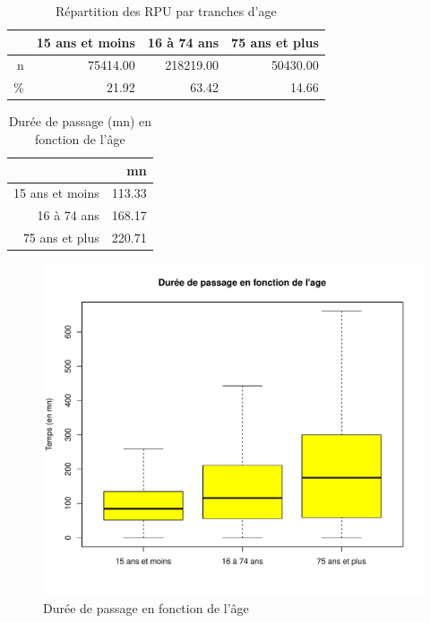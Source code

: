 \documentclass[12pt,english,french,twoside]{book}\usepackage[]{graphicx}\usepackage[]{color}
\makeatletter
\def\maxwidth{ %
  \ifdim\Gin@nat@width>\linewidth
    \linewidth
  \else
    \Gin@nat@width
  \fi
}
\newenvironment{knitrout}{}{} %
\makeatother
\begin{document}
\begin{table}[ht]
\centering
\begin{tabular}{rrrr}
  \hline
 & 15 ans et moins & 16 à 74 ans & 75 ans et plus \\ 
  \hline
n & 75414.00 & 218219.00 & 50430.00 \\ 
  \% & 21.92 & 63.42 & 14.66 \\ 
   \hline
\end{tabular}
\caption[Répartition des RPU par tranches d'age]{Répartition des RPU par tranches d'age } 
\label{tab:tranches_age}
\end{table}




\begin{table}[ht]
\centering
\begin{tabular}{rr}
  \hline
 & mn \\ 
  \hline
15 ans et moins & 113.33 \\ 
  16 à 74 ans & 168.17 \\ 
  75 ans et plus & 220.71 \\ 
   \hline
\end{tabular}
\caption[Durée de passage et age]{Durée de passage (mn) en fonction de l'âge} 
\label{tab:age_dp}
\end{table}



\begin{figure}[ht!]
 \centering
\begin{knitrout}
\color{fgcolor}
\includegraphics[width=\maxwidth]{figure/age_groupe2} 

\end{knitrout}

 \caption{Durée de passage en fonction de l'âge}
 \label{fig:bp_age}
\end{figure}
\end{document}
